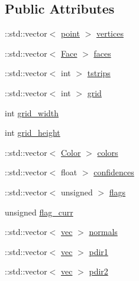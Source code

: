 \subsection*{Public Attributes}
\begin{DoxyCompactItemize}
\item 
\+::std\+::vector$<$ \hyperlink{namespacetrimesh_a325b99fd6454b22fa4c4bc3223271b2c}{point} $>$ \hyperlink{classtrimesh_1_1TriMesh_ac7a4e1c3bf3e16ecf51316d3b9327249}{vertices}
\item 
\+::std\+::vector$<$ \hyperlink{classtrimesh_1_1TriMesh_a06cb64bb6435d5cf4d7b24d2950fe8e7}{Face} $>$ \hyperlink{classtrimesh_1_1TriMesh_acb959dea35f3ffa44e559ce80f86c195}{faces}
\item 
\+::std\+::vector$<$ int $>$ \hyperlink{classtrimesh_1_1TriMesh_aec553d87d4887e42edfaa70d686371aa}{tstrips}
\item 
\+::std\+::vector$<$ int $>$ \hyperlink{classtrimesh_1_1TriMesh_a203a56a248d80adec24dbee460f4e7e3}{grid}
\item 
int \hyperlink{classtrimesh_1_1TriMesh_a0ead98ce791baefa44830255873caf81}{grid\+\_\+width}
\item 
int \hyperlink{classtrimesh_1_1TriMesh_ae441d36a8964b18ba00c1108680c3bdd}{grid\+\_\+height}
\item 
\+::std\+::vector$<$ \hyperlink{classtrimesh_1_1Color}{Color} $>$ \hyperlink{classtrimesh_1_1TriMesh_a353e6841e3a3087b844787bf6a04618b}{colors}
\item 
\+::std\+::vector$<$ float $>$ \hyperlink{classtrimesh_1_1TriMesh_a6ab73ed06ae381db8442a821b5387c91}{confidences}
\item 
\+::std\+::vector$<$ unsigned $>$ \hyperlink{classtrimesh_1_1TriMesh_a96f4140c06e5f9f363dbff371b1ec137}{flags}
\item 
unsigned \hyperlink{classtrimesh_1_1TriMesh_acfada88d311cd48638cecd8a8acb2cf2}{flag\+\_\+curr}
\item 
\+::std\+::vector$<$ \hyperlink{namespacetrimesh_a4fc2b83feba99c931f837a0c7d4b4df1}{vec} $>$ \hyperlink{classtrimesh_1_1TriMesh_a5ec6eef6589393e7d445f77bcb33ee74}{normals}
\item 
\+::std\+::vector$<$ \hyperlink{namespacetrimesh_a4fc2b83feba99c931f837a0c7d4b4df1}{vec} $>$ \hyperlink{classtrimesh_1_1TriMesh_a6b7ecb1bb2d796fa9be744f30d40c10d}{pdir1}
\item 
\+::std\+::vector$<$ \hyperlink{namespacetrimesh_a4fc2b83feba99c931f837a0c7d4b4df1}{vec} $>$ \hyperlink{classtrimesh_1_1TriMesh_a4e01dd13cfdac282bec1f14516745489}{pdir2}
\item 

\end{DoxyCompactItemize}
